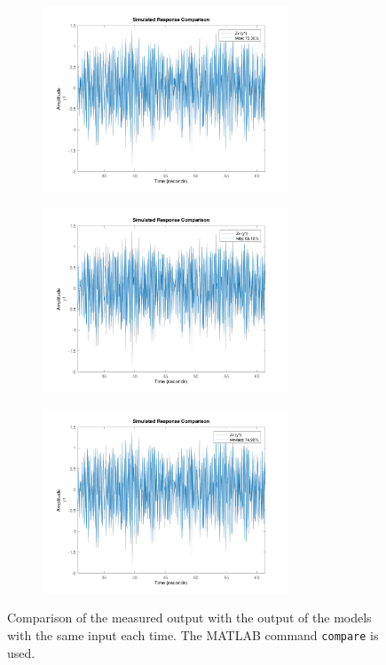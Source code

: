 \begin{figure}[h]
	\begin{subfigure}{.49\textwidth}
		\includegraphics[height=5.5cm]{figures/c_oe.png}
		\label{fig:c_oe}
	\end{subfigure}
	\begin{subfigure}{.49\textwidth}
		\includegraphics[height=5.5cm]{figures/c_bj.png}
		\label{fig:c_bj}
	\end{subfigure}\hfill
	\begin{subfigure}{.49\textwidth}
		\includegraphics[height=5.5cm]{figures/c_n4sid.png}
		\label{fig:c_n4sid}
	\end{subfigure}
	\caption{Comparison of the measured output with the output of the models with the same input each time. The MATLAB command \texttt{compare} is used. }\label{fig:comparison}
\end{figure}

